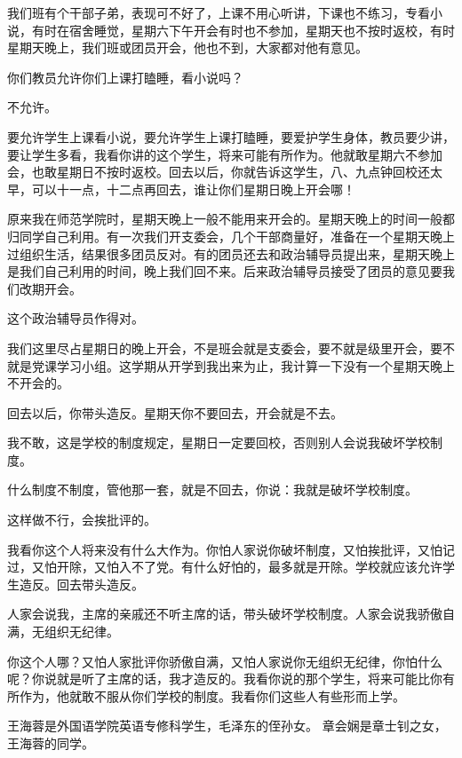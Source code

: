 我们班有个干部子弟，表现可不好了，上课不用心听讲，下课也不练习，专看小说，有时在宿舍睡觉，星期六下午开会有时也不参加，星期天也不按时返校，有时星期天晚上，我们班或团员开会，他也不到，大家都对他有意见。

你们教员允许你们上课打瞌睡，看小说吗？

不允许。

要允许学生上课看小说，要允许学生上课打瞌睡，要爱护学生身体，教员要少讲，要让学生多看，我看你讲的这个学生，将来可能有所作为。他就敢星期六不参加会，也敢星期日不按时返校。回去以后，你就告诉这学生，八、九点钟回校还太早，可以十一点，十二点再回去，谁让你们星期日晚上开会哪！

原来我在师范学院时，星期天晚上一般不能用来开会的。星期天晚上的时间一般都归同学自己利用。有一次我们开支委会，几个干部商量好，准备在一个星期天晚上过组织生活，结果很多团员反对。有的团员还去和政治辅导员提出来，星期天晚上是我们自己利用的时间，晚上我们回不来。后来政治辅导员接受了团员的意见要我们改期开会。

这个政治辅导员作得对。

我们这里尽占星期日的晚上开会，不是班会就是支委会，要不就是级里开会，要不就是党课学习小组。这学期从开学到我出来为止，我计算一下没有一个星期天晚上不开会的。

回去以后，你带头造反。星期天你不要回去，开会就是不去。

我不敢，这是学校的制度规定，星期日一定要回校，否则别人会说我破坏学校制度。

什么制度不制度，管他那一套，就是不回去，你说：我就是破坏学校制度。

这样做不行，会挨批评的。

我看你这个人将来没有什么大作为。你怕人家说你破坏制度，又怕挨批评，又怕记过，又怕开除，又怕入不了党。有什么好怕的，最多就是开除。学校就应该允许学生造反。回去带头造反。

人家会说我，主席的亲戚还不听主席的话，带头破坏学校制度。人家会说我骄傲自满，无组织无纪律。

你这个人哪？又怕人家批评你骄傲自满，又怕人家说你无组织无纪律，你怕什么呢？你说就是听了主席的话，我才造反的。我看你说的那个学生，将来可能比你有所作为，他就敢不服从你们学校的制度。我看你们这些人有些形而上学。

\begin{maonote}
王海蓉是外国语学院英语专修科学生，毛泽东的侄孙女。
章会娴是章士钊之女，王海蓉的同学。
\end{maonote}
